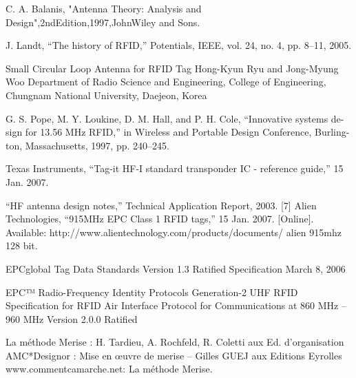 \documentclass[11pt, a4paper, twoside]{book}
\begin{document}
\begin{thebibliography}{9}

C. A. Balanis, "Antenna Theory: Analysis and
Design",2ndEdition,1997,JohnWiley and Sons.
 



  J. Landt, “The history of RFID,” Potentials, IEEE, vol. 24, no. 4, pp. 8–11, 2005.

 Small Circular Loop Antenna for RFID Tag
Hong-Kyun Ryu and Jong-Myung Woo
Department of Radio Science and Engineering, College of Engineering, Chungnam National University, Daejeon, Korea

 G. S. Pope, M. Y. Loukine, D. M. Hall, and P. H. Cole, “Innovative systems de- sign for 13.56 MHz RFID,” in Wireless and Portable Design Conference, Burling- ton, Massachusetts, 1997, pp. 240–245.

  Texas Instruments, “Tag-it HF-I standard transponder IC - reference guide,” 15 Jan. 2007. 

  “HF antenna design notes,” Technical Application Report, 2003.
[7] Alien Technologies, “915MHz EPC Class 1 RFID tags,” 15 Jan. 2007. [Online]. Available: http://www.alientechnology.com/products/documents/
alien 915mhz 128 bit.%

  EPCglobal Tag Data Standards Version 1.3 Ratified Specification
March 8, 2006

 EPC™ Radio-Frequency Identity Protocols Generation-2 UHF RFID
Specification for RFID Air Interface Protocol for Communications at 860 MHz – 960 MHz 
Version 2.0.0 Ratified

  La méthode Merise : H. Tardieu, A. Rochfeld, R. Coletti aux Ed. d’organisation
AMC*Designor : Mise en œuvre de merise – Gilles GUEJ aux Editions Eyrolles
www.commentcamarche.net: La méthode Merise. 

\end{thebibliography}
\end{document}
